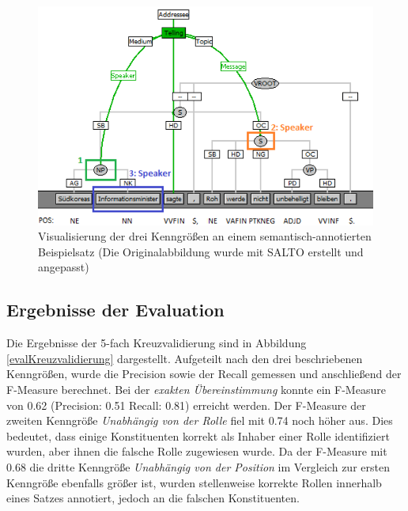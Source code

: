 \documentclass[12pt]{article}
\begin{document}
	\begin{figure}[tb!]
		\centering
		\includegraphics{images/evaluation_kenngroeszen.png}
		\caption[Visualisierung der Kenngrößen]{Visualisierung der drei Kenngrößen an einem semantisch-annotierten Beispielsatz (Die Originalabbildung wurde mit SALTO\citep{burchardt06salto} erstellt und angepasst)}
		\label{evalKenngroeszen}
	\end{figure}


\subsection{Ergebnisse der Evaluation}

Die Ergebnisse der 5-fach Kreuzvalidierung sind in Abbildung \ref{evalKreuzvalidierung} dargestellt. Aufgeteilt nach den drei beschriebenen Kenngrößen, wurde die Precision sowie der Recall gemessen und anschließend der F-Measure berechnet. Bei der \textit{exakten Übereinstimmung} konnte ein F-Measure von 0.62 (Precision: 0.51 Recall: 0.81) erreicht werden. Der F-Measure der zweiten Kenngröße \textit{Unabhängig von der Rolle} fiel mit 0.74 noch höher aus. Dies bedeutet, dass einige Konstituenten korrekt als Inhaber einer Rolle identifiziert wurden, aber ihnen die falsche Rolle zugewiesen wurde. Da der F-Measure mit 0.68 die dritte Kenngröße \textit{Unabhängig von der Position} im Vergleich zur ersten Kenngröße ebenfalls größer ist, wurden stellenweise korrekte Rollen innerhalb eines Satzes annotiert, jedoch an die falschen Konstituenten. 

\end{document}
